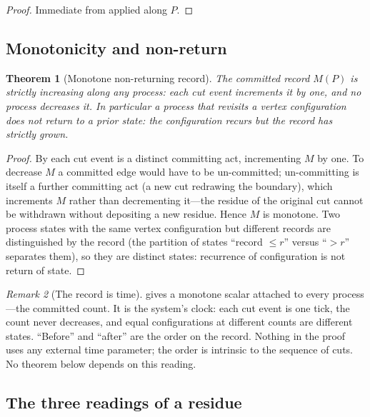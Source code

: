 \documentclass[11pt,twocolumn,a4paper]{article}
\theoremstyle{thmstyle}
\newtheorem{theorem}{Theorem}[section]
\theoremstyle{definition}
\theoremstyle{remark}
\newtheorem{remark}[theorem]{Remark}
\newcommand{\rec}{M}                     %
\begin{document}
\begin{proof}
Immediate from  applied along $P$.
\end{proof}

\subsection{Monotonicity and non-return}

\begin{theorem}[Monotone non-returning record]
\label{thm:monotone}
The committed record $\rec(P)$ is strictly increasing along any process:
each cut event increments it by one, and no process decreases it. In
particular a process that revisits a vertex configuration does not return
to a prior state: the configuration recurs but the record has strictly
grown.
\end{theorem}

\begin{proof}
By  each cut event is a distinct committing act,
incrementing $\rec$ by one. To decrease $\rec$ a committed edge would have
to be un-committed; un-committing is itself a further committing act (a new
cut redrawing the boundary), which increments $\rec$ rather than
decrementing it---the residue of the original cut cannot be withdrawn
without depositing a new residue. Hence $\rec$ is monotone. Two process
states with the same vertex configuration but different records are
distinguished by the record (the partition of states ``record $\le r$''
versus ``$>r$'' separates them), so they are distinct states: recurrence of
configuration is not return of state.
\end{proof}

\begin{remark}[The record is time]
\label{rem:time}
 gives a monotone scalar attached to every process---the
committed count. It is the system's clock: each cut event is one tick, the
count never decreases, and equal configurations at different counts are
different states. ``Before'' and ``after'' are the order on the record.
Nothing in the proof uses any external time parameter; the order is
intrinsic to the sequence of cuts. No theorem below depends on this
reading.
\end{remark}

\subsection{The three readings of a residue}
\end{document}
